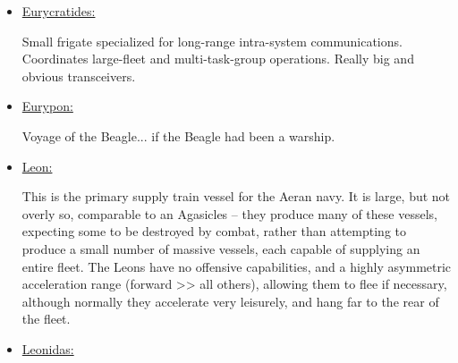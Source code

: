 \begin{itemize}
\item \href{http://vegastrike.sourceforge.net/wiki/Vessel:Eurycratides}{Eurycratides:}

Small frigate specialized for long-range intra-system
communications. Coordinates large-fleet and multi-task-group
operations. Really big and obvious transceivers.



\item \href{http://vegastrike.sourceforge.net/wiki/Vessel:Eurypon}{Eurypon:}

Voyage of the Beagle... if the Beagle had been a warship.


\item \href{http://vegastrike.sourceforge.net/wiki/Vessel:Leon}{Leon:}

This is the primary supply train vessel for the Aeran navy. It is
large, but not overly so, comparable to an Agasicles -- they produce
many of these vessels, expecting some to be destroyed by combat,
rather than attempting to produce a small number of massive vessels,
each capable of supplying an entire fleet. The Leons have no offensive
capabilities, and a highly asymmetric acceleration range (forward >>
all others), allowing them to flee if necessary, although normally
they accelerate very leisurely, and hang far to the rear of the fleet.


\item \href{http://vegastrike.sourceforge.net/wiki/Vessel:Leonidas}{Leonidas:}


\end{itemize}
